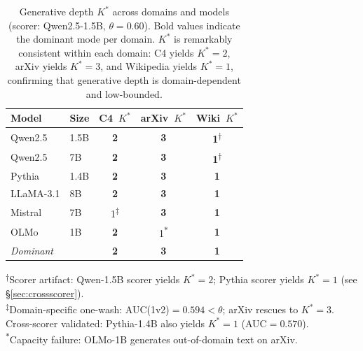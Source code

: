 \begin{table}[t]
\centering
\caption{Generative depth $K^*$ across domains and models (scorer: Qwen2.5-1.5B, $\theta{=}0.60$). Bold values indicate the dominant mode per domain. $K^*$ is remarkably consistent within each domain: C4 yields $K^*{=}2$, arXiv yields $K^*{=}3$, and Wikipedia yields $K^*{=}1$, confirming that generative depth is domain-dependent and low-bounded.}
\label{tab:domain_model_kstar}
{\small
\begin{tabular}{llccc}
\toprule
\textbf{Model} & \textbf{Size} & \textbf{C4}~$K^*$ & \textbf{arXiv}~$K^*$ & \textbf{Wiki}~$K^*$ \\
\midrule
Qwen2.5       & 1.5B & \textbf{2} & \textbf{3} & \textbf{1}\textsuperscript{$\dagger$} \\
Qwen2.5       & 7B   & \textbf{2} & \textbf{3} & \textbf{1}\textsuperscript{$\dagger$} \\
Pythia        & 1.4B & \textbf{2} & \textbf{3} & \textbf{1} \\
LLaMA-3.1    & 8B   & \textbf{2} & \textbf{3} & \textbf{1} \\
Mistral       & 7B   & 1\textsuperscript{$\ddagger$} & \textbf{3} & \textbf{1} \\
OLMo          & 1B   & \textbf{2} & 1\textsuperscript{$*$} & \textbf{1} \\
\midrule
\textit{Dominant} & & \textbf{2} & \textbf{3} & \textbf{1} \\
\bottomrule
\end{tabular}
}
\vspace{2pt}

{\footnotesize
\textsuperscript{$\dagger$}Scorer artifact: Qwen-1.5B scorer yields $K^*{=}2$; Pythia scorer yields $K^*{=}1$ (see \S\ref{sec:crossscorer}).\\
\textsuperscript{$\ddagger$}Domain-specific one-wash: AUC(1v2)${=}0.594{<}\theta$; arXiv rescues to $K^*{=}3$. Cross-scorer validated: Pythia-1.4B also yields $K^*{=}1$ (AUC${=}0.570$).\\
\textsuperscript{$*$}Capacity failure: OLMo-1B generates out-of-domain text on arXiv.
}
\end{table}
